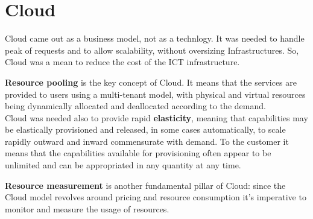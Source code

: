 \chapter{Cloud}
Cloud came out as a business model, not as a technlogy.
It was needed to handle peak of requests and to allow scalability, without oversizing Infrastructures.
So, Cloud was a mean to reduce the cost of the ICT infrastructure.


\textbf{Resource pooling} is the key concept of Cloud. It means that the services are provided to users using a multi-tenant model, with physical and virtual resources being dynamically allocated and deallocated according to the demand.\\
Cloud was needed also to provide rapid \textbf{elasticity}, meaning that capabilities may be elastically provisioned and released, in some cases automatically, to scale rapidly outward and inward commensurate with demand. 
To the customer it means that the capabilities available for provisioning often appear to be unlimited and can be appropriated in any quantity at any time.

\textbf{Resource measurement} is another fundamental pillar of Cloud: since the Cloud model revolves around pricing and resource consumption it's imperative to monitor and measure the usage of resources.


